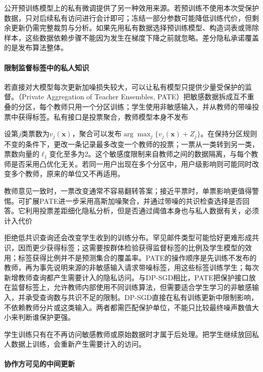 公开预训练模型上的私有微调提供了另一种效用来源。若预训练不使用本次受保护数据，只对后续私有访问进行会计即可；冻结一部分参数可能降低训练代价，但剩余更新仍需完整裁剪与分析。如果先用私有数据选择预训练模型、构造词表或筛除样本，这些数据依赖步骤不能因为发生在梯度下降之前就忽略。差分隐私承诺覆盖的是发布算法整体。

\paragraph{限制监督标签中的私人知识}

若直接对大模型每次更新加噪损失较大，可以让私有模型只提供少量受保护的监督。（Private Aggregation of Teacher Ensembles, PATE）把敏感数据拆成互不重叠的分区，每个教师只用一个分区训练；学生使用非敏感输入，并从教师的带噪投票中获得标签。私有接口是投票聚合，教师模型本身不发布

设第$j$类票数为$v_j(\bm x)$，聚合可以发布$\arg\max_j\{v_j(\bm x)+Z_j\}$。在保持分区规则不变的条件下，更改一条记录最多改变一个教师的投票；一票从一类转到另一类，票数向量的$\ell_1$变化至多为2。这个敏感度限制来自教师之间的数据隔离，与每个教师是否采用凸优化无关。若同一用户出现在多个分区中，用户级影响则可能同时改变多个教师，原来的单位又不再适用。

教师意见一致时，一票改变通常不容易翻转答案；接近平票时，单票影响更值得警惕。可扩展PATE进一步采用高斯加噪聚合，并通过带噪的共识检查选择是否回答。它利用投票差距细化隐私分析，但是否通过阈值本身也与私人数据有关，必须计入代价

拒绝低共识查询还会改变学生收到的训练分布。罕见邮件类型可能恰好更难形成共识，因而更少获得标签；这需要按群体检验获得监督标签的比例及学生模型的效用；标签获得比例并不是预测集合的覆盖率。PATE的操作顺序是先训练不发布的教师，再为事先说明来源的非敏感输入请求带噪标签，用这些标签训练学生；每次新增教师查询都产生需要计入的隐私访问。与DP-SGD相比，PATE把保护接口放在监督标签上，允许教师内部使用不同训练算法，但需要适合学生学习的非敏感输入，并承受查询数与共识不足的限制。DP-SGD直接在私有训练更新中限制影响，不依赖教师分片或这类输入。两者都需匹配保护单位，不能只比较最终噪声数值大小来判断谁保护更强。

学生训练只有在不再访问敏感教师或原始数据时才属于后处理。把学生继续放回私人数据上训练，会重新产生需要计入的访问。

\paragraph{协作方可见的中间更新}

